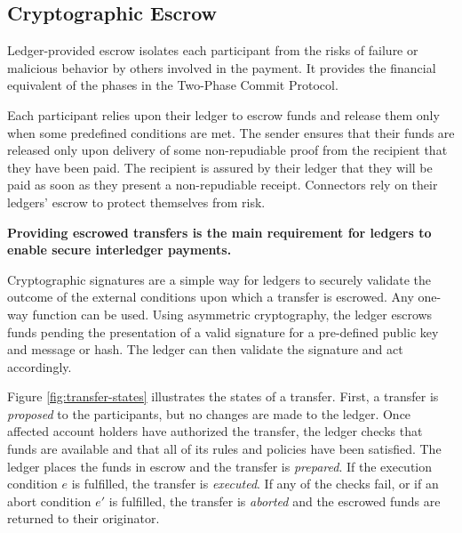 \documentclass[letterpaper,twocolumn,10pt]{article}
\begin{document}

\subsection{Cryptographic Escrow}




Ledger-provided escrow isolates each participant from the risks of failure or malicious behavior by others involved in the payment. It provides the financial equivalent of the phases in the Two-Phase Commit Protocol. \cite{Gray:1978:NDB:647433.723863}\cite{gray2006consensus}

Each participant relies upon their ledger to escrow funds and release them only when some predefined conditions are met. The sender ensures that their funds are released only upon delivery of some non-repudiable proof from the recipient that they have been paid. The recipient is assured by their ledger that they will be paid as soon as they present a non-repudiable receipt. Connectors rely on their ledgers' escrow to protect themselves from risk.

\textbf{Providing escrowed transfers is the main requirement for ledgers to enable secure interledger payments.}

Cryptographic signatures are a simple way for ledgers to securely validate the outcome of the external conditions upon which a transfer is escrowed. Any one-way function can be used.\cite{rompel1990one} Using asymmetric cryptography, the ledger escrows funds pending the presentation of a valid signature for a pre-defined public key and message or hash. The ledger can then validate the signature and act accordingly.

Figure \ref{fig:transfer-states} illustrates the states of a transfer. First, a transfer is \textit{proposed} to the participants, but no changes are made to the ledger. Once affected account holders have authorized the transfer, the ledger checks that funds are available and that all of its rules and policies have been satisfied. The ledger places the funds in escrow and the transfer is \textit{prepared}. If the execution condition $e$ is fulfilled, the transfer is \textit{executed}. If any of the checks fail, or if an abort condition $e'$ is fulfilled, the transfer is \textit{aborted} and the escrowed funds are returned to their originator.
\end{document}
